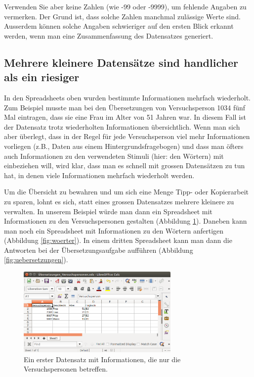 \documentclass[oneside, 10pt]{book}\usepackage[]{graphicx}\usepackage[]{xcolor}
\begin{document}
Verwenden Sie aber keine Zahlen
(wie -99 oder -9999), um fehlende Angaben zu vermerken.
Der Grund ist, dass solche Zahlen manchmal zulässige
Werte sind. Ausserdem können solche Angaben
schwieriger auf den ersten Blick erkannt werden,
wenn man eine Zusammenfassung des Datensatzes generiert.

\subsection{Mehrere kleinere Datensätze sind handlicher als ein riesiger}
\label{sec:mehrere_kleine}
In den Spread\-sheets oben wurden bestimmte
Informationen mehrfach wiederholt. Zum Beispiel
musste man bei den Übersetzungen von Versuchsperson
1034 fünf Mal eintragen, dass sie eine Frau im Alter
von 51 Jahren war. In diesem Fall ist der Datensatz
trotz wiederholten Informationen übersichtlich.
Wenn man sich aber überlegt, dass in der Regel für
jede Versuchsperson viel mehr Informationen
vorliegen (z.B., Daten aus einem Hintergrundsfragebogen)
und dass man öfters auch Informationen zu den verwendeten
Stimuli (hier: den Wörtern) mit einbeziehen will,
wird klar, dass man es schnell mit grossen Datensätzen
zu tun hat, in denen viele Informationen mehrfach
wiederholt werden.

Um die Übersicht zu bewahren und um sich eine 
Menge Tipp- oder Kopierarbeit zu sparen, lohnt
es sich, statt eines grossen Datensatzes
mehrere kleinere zu verwalten. In unserem Beispiel
würde man dann ein Spread\-sheet mit Informationen
zu den Versuchspersonen gestalten (Abbildung \ref{fig:versuchspersonen}).
Daneben kann man noch ein Spread\-sheet mit Informationen
zu den Wörtern anfertigen (Abbildung \ref{fig:woerter}).
In einem dritten Spread\-sheet kann man dann die Antworten bei der 
Übersetzungsaufgabe aufführen (Abbildung \ref{fig:uebersetzungen}).

\begin{figure}[tp]
\centering
\includegraphics[max width = 0.7\textwidth]{figs/versuchspersonen.png}
\caption{Ein erster Datensatz mit Informationen, die nur die Versuchspersonen betreffen.}
\label{fig:versuchspersonen}
\end{figure}
\end{document}
